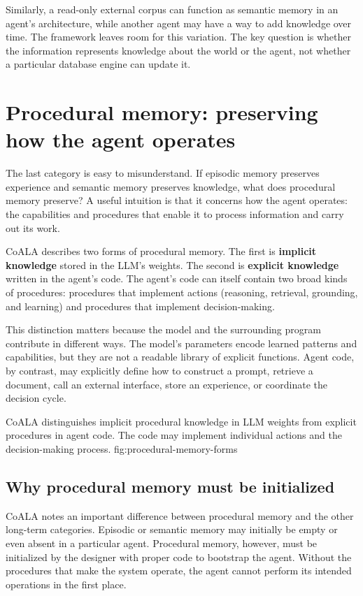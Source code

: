 Similarly, a read-only external corpus can function as semantic memory in an agent's architecture, while another agent may have a way to add knowledge over time. The framework leaves room for this variation. The key question is whether the information represents knowledge about the world or the agent, not whether a particular database engine can update it.

\section{Procedural memory: preserving how the agent operates}
\label{sec:procedural-memory}

The last category is easy to misunderstand. If episodic memory preserves experience and semantic memory preserves knowledge, what does procedural memory preserve? A useful intuition is that it concerns how the agent operates: the capabilities and procedures that enable it to process information and carry out its work.

CoALA describes two forms of procedural memory. The first is \textbf{implicit knowledge} stored in the LLM's weights. The second is \textbf{explicit knowledge} written in the agent's code. The agent's code can itself contain two broad kinds of procedures: procedures that implement actions (reasoning, retrieval, grounding, and learning) and procedures that implement decision-making.

This distinction matters because the model and the surrounding program contribute in different ways. The model's parameters encode learned patterns and capabilities, but they are not a readable library of explicit functions. Agent code, by contrast, may explicitly define how to construct a prompt, retrieve a document, call an external interface, store an experience, or coordinate the decision cycle.

  {CoALA distinguishes implicit procedural knowledge in LLM weights from explicit procedures in agent code. The code may implement individual actions and the decision-making process.}
  {fig:procedural-memory-forms}

\subsection{Why procedural memory must be initialized}

CoALA notes an important difference between procedural memory and the other long-term categories. Episodic or semantic memory may initially be empty or even absent in a particular agent. Procedural memory, however, must be initialized by the designer with proper code to bootstrap the agent. Without the procedures that make the system operate, the agent cannot perform its intended operations in the first place.

